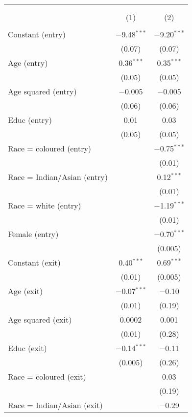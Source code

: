 
\begin{table}[!htbp] \centering 
  \caption{} 
  \label{table_covariates_unrestricted} 
\begin{tabular}{@{\extracolsep{5pt}}lcc} 
\\[-1.8ex]\hline 
\hline \\[-1.8ex] 
\\[-1.8ex] & (1) & (2)\\ 
\hline \\[-1.8ex] 
 Constant (entry) & $-$9.48$^{***}$ & $-$9.20$^{***}$ \\ 
  & (0.07) & (0.07) \\ 
  Age (entry) & 0.36$^{***}$ & 0.35$^{***}$ \\ 
  & (0.05) & (0.05) \\ 
  Age squared (entry) & $-$0.005 & $-$0.005 \\ 
  & (0.06) & (0.06) \\ 
  Educ (entry) & 0.01 & 0.03 \\ 
  & (0.05) & (0.05) \\ 
  Race = coloured (entry) &  & $-$0.75$^{***}$ \\ 
  &  & (0.01) \\ 
  Race = Indian/Asian (entry) &  & 0.12$^{***}$ \\ 
  &  & (0.01) \\ 
  Race = white (entry) &  & $-$1.19$^{***}$ \\ 
  &  & (0.01) \\ 
  Female (entry) &  & $-$0.70$^{***}$ \\ 
  &  & (0.005) \\ 
  Constant (exit) & 0.40$^{***}$ & 0.69$^{***}$ \\ 
  & (0.01) & (0.005) \\ 
  Age (exit) & $-$0.07$^{***}$ & $-$0.10 \\ 
  & (0.01) & (0.19) \\ 
  Age squared (exit) & 0.0002 & 0.001 \\ 
  & (0.01) & (0.28) \\ 
  Educ (exit) & $-$0.14$^{***}$ & $-$0.11 \\ 
  & (0.005) & (0.26) \\ 
  Race = coloured (exit) &  & 0.03 \\ 
  &  & (0.19) \\ 
  Race = Indian/Asian (exit) &  & $-$0.29 \\ 

\end{tabular}
\end{table}
